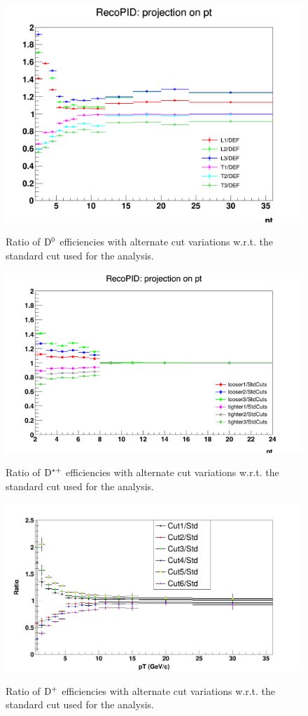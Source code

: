 \begin{figure}[h]
\centering
{\includegraphics[width=.7\linewidth]{figures/Systematics/Dzero/CutVar/RatioPromptEff1DMap.png}}
\caption{Ratio of ${\rm D^0}$ efficiencies with alternate cut variations w.r.t. the standard cut used for the analysis.}
\label{fig:D0effVars}
\end{figure}

\begin{figure}[h]
\centering
{\includegraphics[width=.7\linewidth]{figures/Systematics/Dstar/CutVar/RatioPromptEff1DMap.png}}
\caption{Ratio of ${\rm D^{*+}}$ efficiencies with alternate cut variations w.r.t. the standard cut used for the analysis.}
\label{fig:DstareffVars}
\end{figure}

\begin{figure}[!htbp]
\centering
{\includegraphics[width=0.70\linewidth, height=0.43\linewidth]{figures/Systematics/Dplus/Eff/EffcmpratioDplus.png}}
\caption{Ratio of ${\rm D^+}$ efficiencies with alternate cut variations w.r.t. the standard cut used for the analysis.}
\label{fig:DpluseffVars}
\end{figure}

